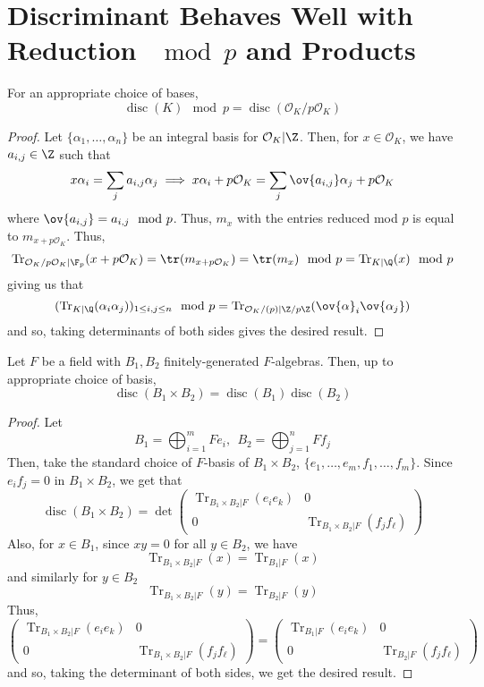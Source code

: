 \documentclass[11pt,leqno,oneside]{amsart}
\numberwithin{thm}{section}
\renewcommand{\O}{\mathcal{O}}
\newcommand{\disc}{\operatorname{disc}}
\newcommand{\Tr}{\operatorname{Tr}}
\begin{document}
\section{Discriminant Behaves  Well with Reduction \(\mod p\) and Products}
\begin{lem}\label{disc-plays-nice-with-mod-p}
  For an appropriate choice of bases, \[
    \disc(K) \mod p = \disc(\O_K/p\O_K)
  \]
\end{lem}
\begin{proof}
  Let \(\{\alpha_1, \ldots, \alpha_n\}\) be an integral basis for
  \(\O_K|\Z\). Then, for \(x \in \O_K\), we have \(a_{i,j} \in \Z\)
  such that \[
    x \alpha_i = \sum_j a_{i,j} \alpha_j \implies x \alpha_i +
    p\O_K = \sum_j \ov{a_{i,j}} \alpha_j + p\O_K
  \]
  where \(\ov{a_{i,j}} = a_{i,j} \mod p\). Thus, \(m_x\) with the entries
  reduced mod \(p\) is equal to \(m_{x+p\O_K}\). Thus, \[
    \Tr_{\O_K/p\O_K | \F_p}(x+p\O_K) = \tr(m_{x+p\O_K}) =
    \tr(m_x) \mod p = \Tr_{K|\Q}(x) \mod p
  \]
  giving us that \[
    (\Tr_{K|\Q}(\alpha_i \alpha_j))_{1 \leq i,j \leq n} \mod p =
    \Tr_{\O_K/(p)|\Z/p\Z}(\ov{\alpha}_i \ov{\alpha_j})
  \]
  and so, taking determinants of both sides gives the desired result.
\end{proof}
\begin{lem}\label{disc-plays-nice-with-prod}
  Let \(F\) be a field with \(B_1, B_2\) finitely-generated
  \(F\)-algebras. Then, up to appropriate choice of basis, \[
    \disc(B_1 \times B_2) = \disc(B_1) \disc(B_2)
  \]
\end{lem}
\begin{proof}
  Let \[
    B_1 = \bigoplus_{i=1}^m F e_i, \ \ B_2 = \bigoplus_{j=1}^n F f_j
  \]
  Then, take the standard choice of \(F\)-basis of \(B_1 \times B_2\),
  \(\{e_1, \ldots, e_m, f_1, \ldots, f_m\}\). Since \(e_i f_j = 0\) in
  \(B_1 \times B_2\), we get that \[
    \disc(B_1 \times B_2) = \det \left(
      \begin{array}{cc}
        \Tr_{B_1 \times B_2 | F}(e_i e_k)& 0 \\
        0 & \Tr_{B_1 \times B_2 | F}(f_j f_\ell)
      \end{array}
    \right)
  \]
  Also, for \(x \in B_1\), since \(xy = 0\) for all \(y \in B_2\), we
  have \[
    \Tr_{B_1 \times B_2|F}(x) = \Tr_{B_1|F}(x)
  \]
  and similarly for \(y \in B_2\) \[
    \Tr_{B_1 \times B_2|F}(y) = \Tr_{B_2|F}(y)
  \]
  Thus, \[
\left(
      \begin{array}{cc}
        \Tr_{B_1 \times B_2 | F}(e_i e_k)& 0 \\
        0 & \Tr_{B_1 \times B_2 | F}(f_j f_\ell)
      \end{array}
    \right) = \left(
      \begin{array}{cc}
        \Tr_{B_1 | F}(e_i e_k)& 0 \\
        0 & \Tr_{B_2 | F}(f_j f_\ell)
      \end{array}
    \right)
  \]
  and so, taking the determinant of both sides, we get the desired result.
\end{proof}
\end{document}
